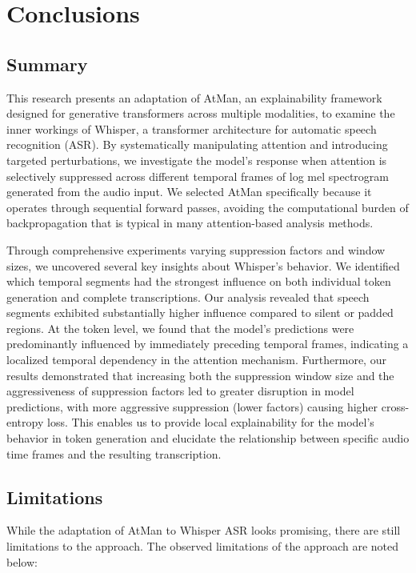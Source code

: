 \documentclass[../report.tex]{subfiles}
\begin{document}
    \section{Conclusions}
    \label{sec:conclusions}
    \subsection{Summary}

    This research presents an adaptation of AtMan, an explainability framework designed for generative transformers across multiple modalities, to examine the inner workings of Whisper, a transformer architecture for automatic speech recognition (ASR). By systematically manipulating attention and introducing targeted perturbations, we investigate the model's response when attention is selectively suppressed across different temporal frames of log mel spectrogram generated from the audio input. We selected AtMan specifically because it operates through sequential forward passes, avoiding the computational burden of backpropagation that is typical in many attention-based analysis methods.

    Through comprehensive experiments varying suppression factors and window sizes, we uncovered several key insights about Whisper's behavior. We identified which temporal segments had the strongest influence on both individual token generation and complete transcriptions. Our analysis revealed that speech segments exhibited substantially higher influence compared to silent or padded regions. At the token level, we found that the model's predictions were predominantly influenced by immediately preceding temporal frames, indicating a localized temporal dependency in the attention mechanism. Furthermore, our results demonstrated that increasing both the suppression window size and the aggressiveness of suppression factors led to greater disruption in model predictions, with more aggressive suppression (lower factors) causing higher cross-entropy loss. 
    This enables us to provide local explainability for the model's behavior in token generation and elucidate the relationship between specific audio time frames and the resulting transcription.

    \subsection{Limitations}
    \label{sec:conclusions:limitations}

    While the adaptation of AtMan to Whisper ASR looks promising, there are still limitations to the approach.
    The observed limitations of the approach are noted below:
\end{document}
